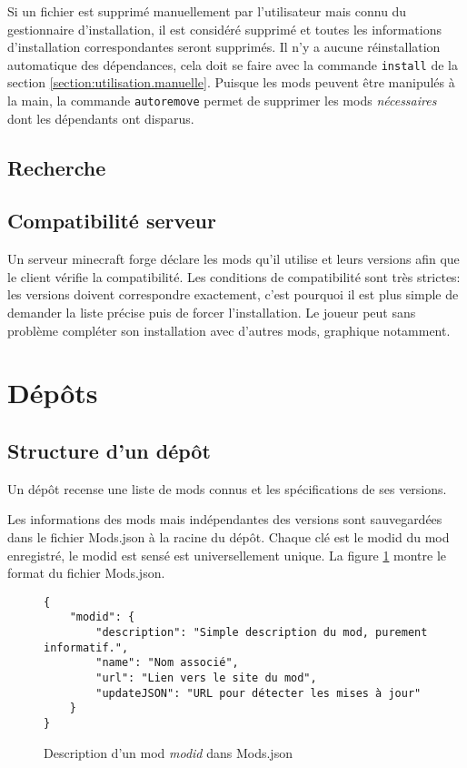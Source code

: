 \documentclass{article}
\begin{document}
Si un fichier est supprimé manuellement par l'utilisateur mais connu du gestionnaire d'installation, il est considéré supprimé et toutes les informations d'installation correspondantes seront supprimés.
Il n'y a aucune réinstallation automatique des dépendances, cela doit se faire avec la commande \texttt{install} de la section \ref{section:utilisation.manuelle}.
Puisque les mods peuvent être manipulés à la main, la commande \texttt{autoremove} permet de supprimer les mods \textit{nécessaires} dont les dépendants ont disparus.

\subsection{Recherche}

\subsection{Compatibilité serveur}
Un serveur minecraft forge déclare les mods qu'il utilise et leurs versions afin que le client vérifie la compatibilité.
Les conditions de compatibilité sont très strictes: les versions doivent correspondre exactement, c'est pourquoi il est plus simple de demander la liste précise puis de forcer l'installation.
Le joueur peut sans problème compléter son installation avec d'autres mods, graphique notamment.


%
%
\section{Dépôts}
\label{section:depot}
\subsection{Structure d'un dépôt}
Un dépôt recense une liste de mods connus et les spécifications de ses versions.

Les informations des mods mais indépendantes des versions sont sauvegardées dans le fichier \textsf{Mods.json} à la racine du dépôt.
Chaque clé est le modid du mod enregistré, le modid est sensé est universellement unique.
La figure \ref{fig:Mods.json} montre le format du fichier \textsf{Mods.json}.

\begin{figure}[h]
\begin{verbatim}
{
    "modid": {
        "description": "Simple description du mod, purement informatif.",
        "name": "Nom associé",
        "url": "Lien vers le site du mod",
        "updateJSON": "URL pour détecter les mises à jour"
    }
}
\end{verbatim}
\caption{Description d'un mod \textit{modid} dans \textsf{Mods.json}}
\label{fig:Mods.json}
\end{figure}
\end{document}
